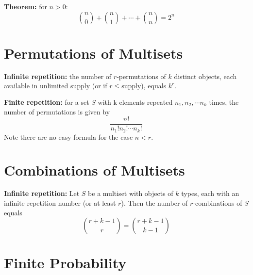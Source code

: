 \documentclass[12pt]{article}
\begin{document}
\textbf{Theorem:} for $n > 0$:
%
\begin{equation}
\binom n 0 + \binom n 1 + \cdots + \binom n n = 2^n
\end{equation}

\section{Permutations of Multisets}

\textbf{Infinite repetition:} the number of $r$-permutations of $k$ distinct objects, each available in unlimited supply (or if $r \leq \text{supply}$), equals $k^r$.

\textbf{Finite repetition:} for a set $S$ with k elements repeated $n_1, n_2, \cdots n_k$ times, the number of permutations is given by
%
\begin{equation}
	\frac{n!}{n_1!n_2! \cdots n_k!}
\end{equation}
%
Note there are no easy formula for the case $n < r$.

\section{Combinations of Multisets}

\textbf{Infinite repetition:} Let $S$ be a multiset with objects of $k$ types, each with an infinite repetition number (or at least $r$). Then the number of $r$-combinations of $S$ equals
%
\begin{equation}
	\binom{r + k - 1}{r} = \binom{r + k - 1}{k - 1}
\end{equation}

\section{Finite Probability}
\end{document}
